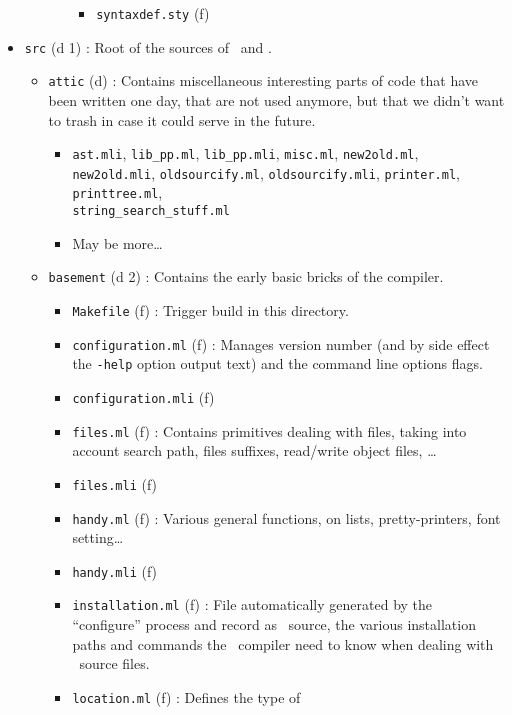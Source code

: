 \begin{itemize}
\begin{itemize}
\begin{itemize}
\begin{itemize}
      \item {\tt syntaxdef.sty} (f)
      \end{itemize}
    \end{itemize}
  \end{itemize}
\item {\tt src} (d 1) : Root of the sources of \focalizec\ and \focalizedep.
  \begin{itemize}
  \item {\tt attic} (d) : Contains miscellaneous interesting parts of
    code that have been written one day, that are not used anymore, but
    that we didn't want to trash in case it could serve in the future.
    \begin{itemize}
    \item {\tt ast.mli}, {\tt lib\_pp.ml}, {\tt lib\_pp.mli},
      {\tt misc.ml}, {\tt new2old.ml}, {\tt new2old.mli},
      {\tt oldsourcify.ml}, {\tt oldsourcify.mli},
      {\tt printer.ml}, {\tt printtree.ml},\\
      {\tt string\_search\_stuff.ml}
    \item May be more\ldots
    \end{itemize}
  \item {\tt basement} (d 2) : Contains the early basic bricks of the
    compiler.
    \begin{itemize}
    \item {\tt Makefile} (f) : Trigger build in this directory.
    \item {\tt configuration.ml} (f) : Manages version number (and
      by side effect the {\tt -help} option output text) and the
      command line options flags.
    \item {\tt configuration.mli} (f)
    \item {\tt files.ml} (f) : Contains primitives dealing with
      files, taking into account search path, files suffixes,
      read/write object files, \ldots
    \item {\tt files.mli} (f)
    \item {\tt handy.ml} (f) : Various general functions, on lists,
      pretty-printers, font setting\ldots
    \item {\tt handy.mli} (f)
    \item {\tt installation.ml} (f) : File automatically generated
      by the ``configure'' process and record as \ocaml\ source, the
      various installation paths and commands the \focalizec\
      compiler need to know when dealing with \focalize\ source
      files.
    \item {\tt location.ml} (f) : Defines the type of

\end{itemize}
\end{itemize}
\end{itemize}
